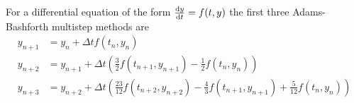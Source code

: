 \documentclass[a4paper, sfsidenotes, twoside]{tufte-handout}
\begin{document}
  For a differential equation of the form $ \frac{\operatorname{d}\!{} y}{\operatorname{d}\!{t}} = f(t, y) $ the
  first three Adams-Bashforth multistep methods are
  \begin{align*}
    y_{n+1} &= y_n + \Delta t f(t_n, y_n)  \\
    y_{n+2} &= y_{n+1} + \Delta t \left( \frac{3}{2}f(t_{n+1}, y_{n+1}) - \frac{1}{2}f(t_n, y_n) \right) \\
    y_{n+3} &= y_{n+2} + \Delta t \left( \frac{23}{12} f(t_{n+2}, y_{n+2}) - \frac{4}{3} f(t_{n+1}, y_{n+1}) + \frac{5}{12}f(t_n, y_n)\right) \\
  \end{align*}



\end{document}
